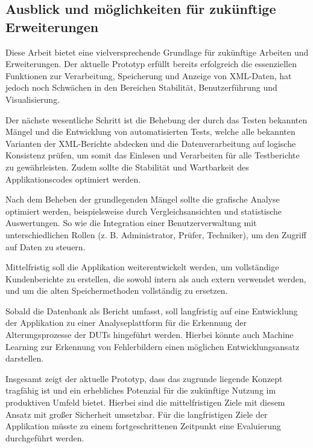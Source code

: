 \subsection{Ausblick und möglichkeiten für zukünftige Erweiterungen}
\label{subsec:moglichkeiten-fur-zukunftige-erweiterungen}

Diese Arbeit bietet eine vielversprechende Grundlage für zukünftige Arbeiten und Erweiterungen.
Der aktuelle Prototyp erfüllt bereits erfolgreich die essenziellen Funktionen zur Verarbeitung, Speicherung und Anzeige von XML-Daten, hat jedoch noch Schwächen in den Bereichen Stabilität, Benutzerführung und Visualisierung.

Der nächste wesentliche Schritt ist die Behebung der durch das Testen bekannten Mängel und die Entwicklung von automatisierten Tests,
welche alle bekannten Varianten der XML-Berichte abdecken und die Datenverarbeitung auf logische Konsistenz prüfen, um somit das Einlesen und Verarbeiten für alle Testberichte zu gewährleisten.
Zudem sollte die Stabilität und Wartbarkeit des Applikationscodes optimiert werden.

Nach dem Beheben der grundlegenden Mängel sollte die grafische Analyse optimiert werden, beispielsweise durch Vergleichsansichten und statistische Auswertungen.
So wie die Integration einer Benutzerverwaltung mit unterschiedlichen Rollen (z. B. Administrator, Prüfer, Techniker), um den Zugriff auf Daten zu steuern.

Mittelfristig soll die Applikation weiterentwickelt werden, um vollständige Kundenberichte zu erstellen, die sowohl intern als auch extern verwendet werden, und um die alten Speichermethoden vollständig zu ersetzen.

Sobald die Datenbank als Bericht umfasst, soll langfristig auf eine Entwicklung der Applikation zu einer Analyseplattform für die Erkennung der Alterungsprozesse der \ac{DUTs} hingeführt werden.
Hierbei könnte auch Machine Learning zur Erkennung von Fehlerbildern einen möglichen Entwicklungsansatz darstellen.

Insgesamt zeigt der aktuelle Prototyp, dass das zugrunde liegende Konzept tragfähig ist und ein erhebliches Potenzial für die zukünftige Nutzung im produktiven Umfeld bietet.
Hierbei sind die mittelfristigen Ziele mit diesem Ansatz mit großer Sicherheit umsetzbar.
Für die langfristigen Ziele der Applikation müsste zu einem fortgeschrittenen Zeitpunkt eine Evaluierung durchgeführt werden.





